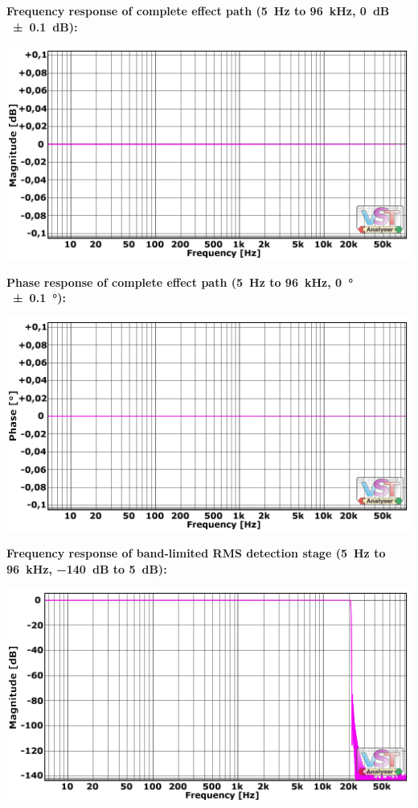 \textbf{Frequency response of complete effect path (\SI{5}{\hertz} to
  \SI{96}{\kilo\hertz}, \SI{0}{\dB} \SI{\pm 0.1}{\dB}):}

\begin{center}
  \includegraphics[scale=0.65,clip]{include/images/fft_192khz-freq-fx_path.png}
\end{center}

\textbf{Phase response of complete effect path (\SI{5}{\hertz} to
  \SI{96}{\kilo\hertz}, \SI{0}{\degree}\,\SI{\pm 0.1}{\degree}):}

\begin{center}
  \includegraphics[scale=0.65,clip]{include/images/fft_192khz-phase-fx_path.png}
\end{center}

\newpage %

\textbf{Frequency response of band-limited RMS detection stage
  (\SI{5}{\hertz} to \SI{96}{\kilo\hertz}, \SI{-140}{\dB} to
  \SI{5}{\dB}):}

\begin{center}
  \includegraphics[scale=0.65,clip]{include/images/fft_192khz-freq-rms.png}
\end{center}

